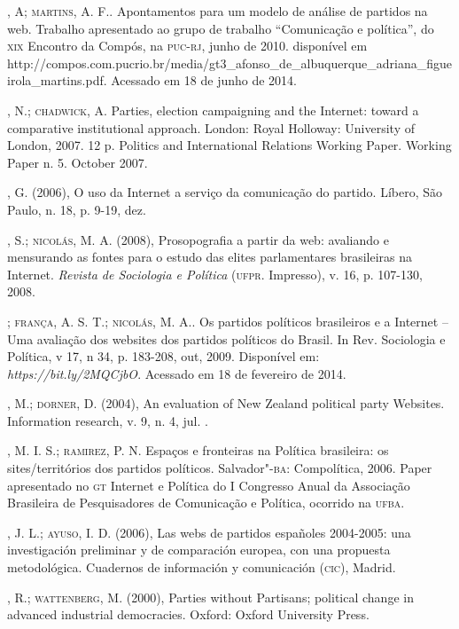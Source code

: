 \begin{bibliohedra}
, A; \textsc{martins}, A. F.. Apontamentos para um modelo de análise
de partidos na web. Trabalho apresentado ao grupo de trabalho
``Comunicação e política'', do \textsc{xix} Encontro da Compós, na \textsc{puc}-\textsc{rj}, junho
de 2010. disponível em
http://compos.com.pucrio.br/media/gt3\_afonso\_de\_albuquerque\_adriana\_figueirola\_martins.pdf.
Acessado em 18 de junho de 2014.

, N.; \textsc{chadwick}, A. Parties, election campaigning and the
Internet: toward a comparative institutional approach. London: Royal
Holloway: University of London, 2007. 12 p. Politics and International
Relations Working Paper. Working Paper n. 5. October 2007.

, G. (2006), O uso da Internet a serviço da comunicação do
partido. Líbero, São Paulo, n. 18, p. 9-19, dez.

, S.; \textsc{nicolás}, M. A. (2008), Prosopografia a partir da web:
avaliando e mensurando as fontes para o estudo das elites parlamentares
brasileiras na Internet. \emph{Revista de Sociologia e Política} (\textsc{ufpr}.
Impresso), v. 16, p. 107-130, 2008.

\titidem; \textsc{frança}, A. S. T.; \textsc{nicolás}, M. A.. Os partidos políticos
brasileiros e a Internet -- Uma avaliação dos websites dos partidos
políticos do Brasil. In Rev. Sociologia e Política, v 17, n 34, p.
183-208, out, 2009. Disponível em:
\emph{https://bit.ly/2MQCjbO}. Acessado em 18 de
fevereiro de 2014.

, M.; \textsc{dorner}, D. (2004), An evaluation of New Zealand political
party Websites. Information research, v. 9, n. 4, jul. .

, M. I. S.; \textsc{ramirez}, P. N. Espaços e fronteiras na Política
brasileira: os sites/territórios dos partidos políticos. Salvador"-\textsc{ba}:
Compolítica, 2006. Paper apresentado no \textsc{gt} Internet e Política do I
Congresso Anual da Associação Brasileira de Pesquisadores de Comunicação
e Política, ocorrido na \textsc{ufba}.

, J. L.; \textsc{ayuso}, I. D. (2006), Las webs de partidos españoles
2004-2005: una investigación preliminar y de comparación europea, con
una propuesta metodológica. Cuadernos de información y comunicación
(\textsc{cic}), Madrid.

, R.; \textsc{wattenberg}, M. (2000), Parties without Partisans; political
change in advanced industrial democracies. Oxford: Oxford University
Press.


\end{bibliohedra}
